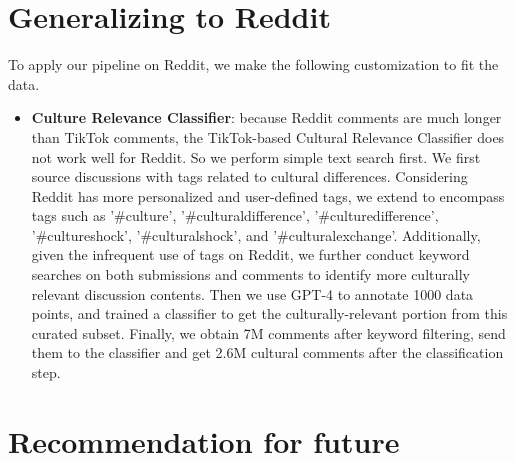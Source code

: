 \documentclass{article} %
\newcommand{\ryan}[1]{\textcolor{magenta}{[#1 --Ryan]}}
\newcommand{\yutong}[1]{\textcolor{orange}{[#1 --Yutong]}}
\begin{document}
\section{Generalizing to Reddit}
\label{appendix:generalization on reddits}
To apply our pipeline on Reddit, we make the following customization to fit the data. 
\begin{itemize}
    \item \textbf{Culture Relevance Classifier}: because Reddit comments are much longer than TikTok comments, the TikTok-based Cultural Relevance Classifier does not work well for Reddit. So we perform simple text search first. We first source discussions with tags related to cultural differences. Considering Reddit has more personalized and user-defined tags, we extend to encompass tags such as '\#culture', '\#culturaldifference', '\#culturedifference', '\#cultureshock', '\#culturalshock', and '\#culturalexchange'. Additionally, given the infrequent use of tags on Reddit, we further conduct keyword searches on both submissions and comments to identify more culturally relevant discussion contents. Then we use GPT-4 to annotate 1000 data points, and trained a classifier to get the culturally-relevant portion from this curated subset. Finally, we obtain 7M comments after keyword filtering, send them to the classifier and get 2.6M cultural comments after the classification step. %
    

\end{itemize}



\section{Recommendation for future}
\end{document}
